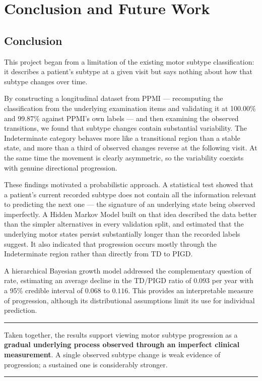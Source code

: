 \documentclass[11pt,a4paper]{article}
\newenvironment{keypoint}
  {\begin{center}\begin{minipage}{0.94\textwidth}%
   \vspace{4pt}\hrule\vspace{7pt}\small}
  {\vspace{7pt}\hrule\vspace{4pt}\end{minipage}\end{center}}
\begin{document}
\section{Conclusion and Future Work}

\subsection{Conclusion}

This project began from a limitation of the existing motor subtype
classification: it describes a patient's subtype at a given visit but says
nothing about how that subtype changes over time.

By constructing a longitudinal dataset from PPMI --- recomputing the
classification from the underlying examination items and validating it at
100.00\% and 99.87\% against PPMI's own labels --- and then examining the
observed transitions, we found that subtype changes contain substantial
variability. The Indeterminate category behaves more like a transitional region
than a stable state, and more than a third of observed changes reverse at the
following visit. At the same time the movement is clearly asymmetric, so the
variability coexists with genuine directional progression.

These findings motivated a probabilistic approach. A statistical test showed
that a patient's current recorded subtype does not contain all the information
relevant to predicting the next one --- the signature of an underlying state
being observed imperfectly. A Hidden Markov Model built on that idea described
the data better than the simpler alternatives in every validation split, and
estimated that the underlying motor states persist substantially longer than the
recorded labels suggest. It also indicated that progression occurs mostly
through the Indeterminate region rather than directly from TD to PIGD.

A hierarchical Bayesian growth model addressed the complementary question of
rate, estimating an average decline in the TD/PIGD ratio of $0.093$ per year
with a 95\% credible interval of $0.068$ to $0.116$. This provides an
interpretable measure of progression, although its distributional assumptions
limit its use for individual prediction.

\begin{keypoint}
Taken together, the results support viewing motor subtype progression as a
\textbf{gradual underlying process observed through an imperfect clinical
measurement}. A single observed subtype change is weak evidence of progression;
a sustained one is considerably stronger.
\end{keypoint}
\end{document}
